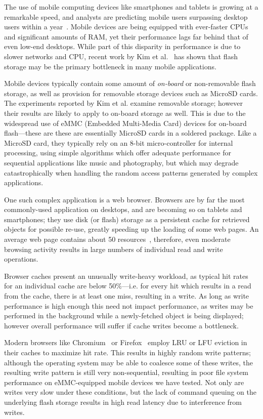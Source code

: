 \documentclass[letterpaper,twocolumn,10pt]{article}
\begin{document}
The use of mobile computing devices like smartphones and tablets is growing at a
remarkable speed, and analysts are predicting mobile users surpassing desktop
users within a year~\cite{ingram10}.  Mobile devices are being equipped with ever-faster
CPUs and significant amounts of RAM, yet their performance lags far
behind that of even low-end desktops. While part of this disparity
in performance is due to slower networks and CPU, recent work by Kim
et al.~\cite{kim12} has shown that flash storage may be the primary
bottleneck in many mobile  applications.

Mobile devices typically contain some amount of \emph{on-board} or
non-removable flash storage, as well as provision for removable storage devices
such as MicroSD cards. The experiments reported by Kim et al. examine
removable storage; however their results are likely  to apply to on-board
storage as well. This is due to the widespread use of eMMC (Embedded Multi-Media
Card) devices for on-board flash---these are these are essentially MicroSD cards
in a soldered package. Like a MicroSD card, they typically rely on an 8-bit
micro-controller for internal processing, using simple algorithms which offer
adequate performance for sequential applications like music and photography, but
which may degrade catastrophically when handling the random access
patterns generated by complex applications.

One such complex application is a web browser.  Browsers are by far the most
commonly-used application on desktops, and are becoming so on tablets and
smartphones; they use disk (or flash) storage as a persistent cache for
retrieved objects for possible re-use, greatly speeding up the loading of some
web pages.  An average web page contains about 50
resources~\cite{google-web-metrics}, therefore, even moderate browsing activity
results in large numbers of individual read and write operations.

Browser caches present an unusually write-heavy workload, as typical
hit rates for an individual cache are below 50\%---i.e. for
every hit which results in a read from the cache, there is at least one
miss, resulting in a write. As long as write performance is high enough
this need not impact performance, as writes may be performed in
the background while a newly-fetched object is being displayed;
however overall performance will suffer if cache writes become a
bottleneck. 

Modern browsers like Chromium~\cite{chromium} or
Firefox~\cite{Firefox} employ LRU or LFU eviction in their caches to
maximize hit rate. This results in highly random write patterns;
although the operating system may be able to coalesce some of these
writes, the resulting write pattern is still very non-sequential,
resulting in poor file system performance on  eMMC-equipped mobile
devices we have tested. Not only are writes very slow under these
conditions, but the lack of command queuing on the underlying flash
storage results in high read latency due to interference from writes.
\end{document}
